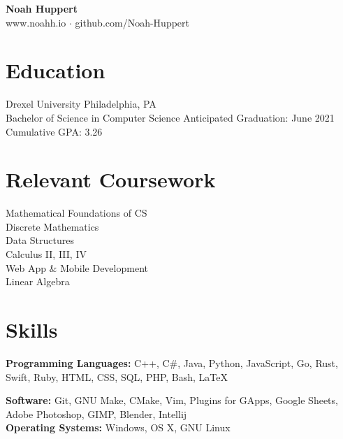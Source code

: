 \documentclass[10pt]{article}
\begin{document}

\centering
	\textbf{Noah Huppert} \\
	
	www.noahh.io $\cdot$ github.com/Noah-Huppert


\begin{flushleft}

\section{Education}
	Drexel University \hfill Philadelphia, PA \\
	Bachelor of Science in Computer Science \hfill Anticipated Graduation: June 2021 \\
	Cumulative GPA: 3.26

\section{Relevant Coursework}
	\begin{addmargin}[1em]{1em}
	\begin{multicols}{3}
		Mathematical Foundations of CS \\
		Discrete Mathematics \\

		Data Structures \\
		Calculus II, III, IV \\

		Web App \& Mobile Development \\
		Linear Algebra 
	\end{multicols} 
	\end{addmargin}


\section{Skills}
	\textbf{Programming Languages:} C++, C\#, Java, Python, JavaScript, Go, Rust, Swift, Ruby, HTML, CSS, SQL, PHP, Bash, LaTeX

	\textbf{Software:} Git, GNU Make, CMake, Vim, Plugins for GApps, Google Sheets, Adobe Photoshop, GIMP, Blender, Intellij \\

	\textbf{Operating Systems:} Windows, OS X, GNU Linux


\end{flushleft}
\end{document}
